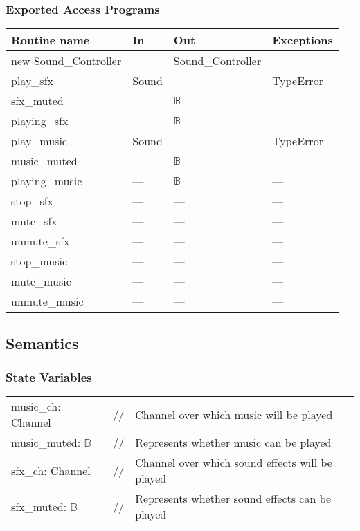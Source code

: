 \documentclass[12pt]{article}
\begin{document}
\subsubsection* {Exported Access Programs}

\begin{tabular}{| l | l | l | p{5cm} |}
\hline
\textbf{Routine name} & \textbf{In} & \textbf{Out} & \textbf{Exceptions}\\
\hline
new Sound\_Controller & --- & Sound\_Controller & ---\\
\hline
play\_sfx             & Sound & ---          & TypeError\\
\hline
sfx\_muted            & ---   & $\mathbb{B}$ & ---\\
\hline
playing\_sfx          & ---   & $\mathbb{B}$ & ---\\
\hline
play\_music           & Sound & ---          & TypeError\\
\hline
music\_muted          & ---   & $\mathbb{B}$ & ---\\
\hline
playing\_music        & ---   & $\mathbb{B}$ & ---\\
\hline
stop\_sfx             & ---   & ---          & ---\\
\hline
mute\_sfx             & ---   & ---          & ---\\
\hline
unmute\_sfx           & ---   & ---          & ---\\
\hline
stop\_music           & ---   & ---          & ---\\
\hline
mute\_music           & ---   & ---          & ---\\
\hline
unmute\_music         & ---   & ---          & ---\\
\hline
\end{tabular}

\subsection* {Semantics}

\subsubsection* {State Variables}

\begin{tabular}{lll}
    music\_ch: Channel         & // & Channel over which music will be played\\ 
    music\_muted: $\mathbb{B}$ & // & Represents whether music can be played\\
    sfx\_ch: Channel           & // & Channel over which sound effects will be played\\
    sfx\_muted: $\mathbb{B}$   & // & Represents whether sound effects can be played
\end{tabular}
\end{document}
